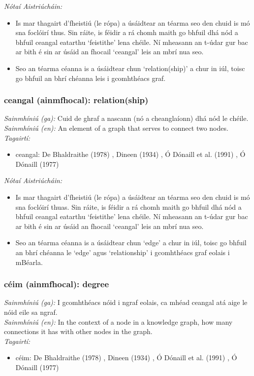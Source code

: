  \noindent \textit{Nótaí Aistriúcháin:}
\begin{itemize}
	\item Is mar thagairt d'fheistiú (le rópa) a úsáidtear an téarma seo den chuid is mó sna foclóirí thus. Sin ráite, is féidir a rá chomh maith go bhfuil dhá nód a bhfuil ceangal eatarthu `feistithe' lena chéile. Ní mheasann an t-údar gur bac ar bith é sin ar úsáid an fhocail `ceangal' leis an mbrí nua seo.
	\item Seo an téarma céanna is a úsáidtear chun `relation(ship)' a chur in iúl, toisc go bhfuil an bhrí chéanna leis i gcomhthéacs graf.
\end{itemize}


\subsubsection*{ceangal (ainmfhocal): relation(ship)}
 \noindent \textit{Sainmhíniú (ga):} Cuid de ghraf a nascann (nó a cheanglaíonn) dhá nód le chéile.
\\
 \noindent \textit{Sainmhíniú (en):} An element of a graph that serves to connect two nodes.
\\
 \noindent \textit{Tagairtí:}
\begin{itemize}
	\item ceangal: De Bhaldraithe (1978) \cite{de-bhaldraithe}, Dineen (1934) \cite{dineen}, Ó Dónaill et al. (1991) \cite{focloir-beag}, Ó Dónaill (1977) \cite{odonaill}
\end{itemize}

 \noindent \textit{Nótaí Aistriúcháin:}
\begin{itemize}
	\item Is mar thagairt d'fheistiú (le rópa) a úsáidtear an téarma seo den chuid is mó sna foclóirí thuas. Sin ráite, is féidir a rá chomh maith go bhfuil dhá nód a bhfuil ceangal eatarthu `feistithe' lena chéile. Ní mheasann an t-údar gur bac ar bith é sin ar úsáid an fhocail `ceangal' leis an mbrí nua seo.
	\item Seo an téarma céanna is a úsáidtear chun `edge' a chur in iúl, toisc go bhfuil an bhrí chéanna le `edge' agus `relationship' i gcomhthéacs graf eolais i mBéarla.
\end{itemize}


\subsubsection*{céim (ainmfhocal): degree}
 \noindent \textit{Sainmhíniú (ga):} I gcomhthéacs nóid i ngraf eolais, ca mhéad ceangal atá aige le nóid eile sa ngraf.
\\
 \noindent \textit{Sainmhíniú (en):} In the context of a node in a knowledge graph, how many connections it has with other nodes in the graph.
\\
 \noindent \textit{Tagairtí:}
\begin{itemize}
	\item céim: De Bhaldraithe (1978) \cite{de-bhaldraithe}, Dineen (1934) \cite{dineen}, Ó Dónaill et al. (1991) \cite{focloir-beag}, Ó Dónaill (1977) \cite{odonaill}
\end{itemize}

